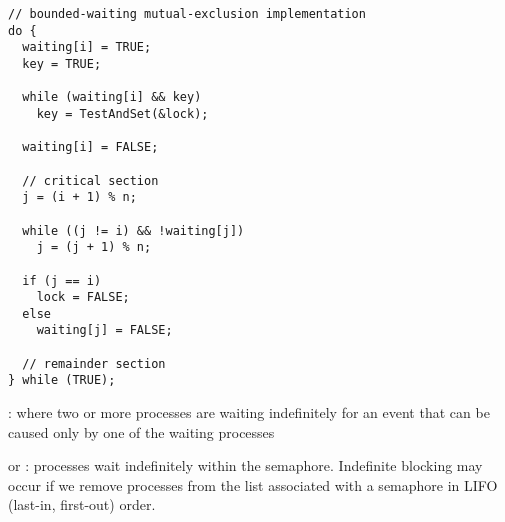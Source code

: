\begin{lstlisting}
// bounded-waiting mutual-exclusion implementation
do {
  waiting[i] = TRUE;
  key = TRUE;

  while (waiting[i] && key)
    key = TestAndSet(&lock);

  waiting[i] = FALSE;

  // critical section
  j = (i + 1) % n;

  while ((j != i) && !waiting[j])
    j = (j + 1) % n;

  if (j == i)
    lock = FALSE;
  else
    waiting[j] = FALSE;

  // remainder section
} while (TRUE);
\end{lstlisting}

    \par {}: where two or more processes are waiting indefinitely for an event that can be caused only by one of the waiting processes
    \par {} or : processes wait indefinitely within the semaphore. Indefinite blocking may occur if we remove processes from the list associated with a semaphore in LIFO (last-in, first-out) order.
